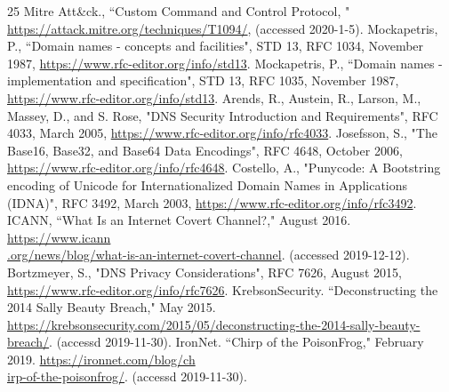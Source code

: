 \documentclass[12pt]{jarticle} %
\begin{document}
\newpage
%
\begin{thebibliography} {25}\small
  Mitre Att\&ck., ``Custom Command and Control Protocol, " \href{https://attack.mitre.org/techniques/T1094/}{https://attack.mitre.org/techniques/T1094/}, (accessed 2020-1-5).
  Mockapetris, P., ``Domain names - concepts and facilities", STD 13, RFC 1034, November 1987, \href{https://www.rfc-editor.org/info/std13}{https://www.rfc-editor.org/info/std13}.
  Mockapetris, P., ``Domain names - implementation and specification", STD 13, RFC 1035, November 1987, \href{https://www.rfc-editor.org/info/std13}{https://www.rfc-editor.org/info/std13}.
  Arends, R., Austein, R., Larson, M., Massey, D., and S. Rose, "DNS Security Introduction and Requirements", RFC 4033, March 2005, \href{{https://www.rfc-editor.org/info/rfc4033}}{https://www.rfc-editor.org/info/rfc4033}.
  Josefsson, S., "The Base16, Base32, and Base64 Data Encodings", RFC 4648, October 2006, \href{https://www.rfc-editor.org/info/rfc4648}{https://www.rfc-editor.org/info/rfc4648}.
  Costello, A., "Punycode: A Bootstring encoding of Unicode for Internationalized Domain Names in Applications (IDNA)", RFC 3492, March 2003, \href{https://www.rfc-editor.org/info/rfc3492}{https://www.rfc-editor.org/info/rfc3492}.
  ICANN, ``What Is an Internet Covert Channel?," August 2016. \href{https://www.icann.org/news/blog/what-is-an-internet-covert-channel}{https://www.icann\\.org/news/blog/what-is-an-internet-covert-channel}. (accessed 2019-12-12).
  Bortzmeyer, S., "DNS Privacy Considerations", RFC 7626, August 2015, \href{https://www.rfc-editor.org/info/rfc7626}{https://www.rfc-editor.org/info/rfc7626}.
  KrebsonSecurity. ``Deconstructing the 2014 Sally Beauty Breach," May 2015. \href{https://krebsonsecurity.com/2015/05/deconstructing-the-2014-sally-beauty-breach/}{https://krebsonsecurity.com/2015/05/deconstructing-the-2014-sally-beauty-breach/}. (accessd 2019-11-30).
  IronNet. ``Chirp of the PoisonFrog," February 2019. \href{https://ironnet.com/blog/chirp-of-the-poisonfrog/}{https://ironnet.com/blog/ch\\irp-of-the-poisonfrog/}. (accessd 2019-11-30).

\end{thebibliography}
\end{document}
